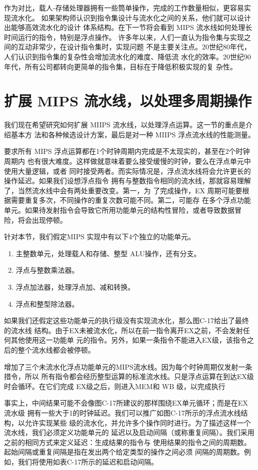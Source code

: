 作为对比，载人-存储处理器拥有一些筒单操作，完成的工作数量相似，更容易实现流水化。
如果架构师认识到指令集设计与流水化之间的关系，他们就可以设计出能够高效流水化的设计
体系结构。在下一节将会看到 MIPS 流水线如何处理长时间运行的指令，特别是浮点操作。
许多年以来，人们一直认为指令集与实现之间的互动非常少，在设计指令集时，实现问题
不是主要关注点。20世纪80年代，人们认识到指令集的复杂性会增加流水化的难度、降低流
水化的效率。20世纪90年代，所有公司都转向更简单的指令集，目标在于降低积极实现的复
杂性。

\section{扩展 MIPS 流水线，以处理多周期操作}

我们现在希望研究如何扩展 MIIPS 流水线，以处理浮点运算。这一节的重点是介绍基本方
法和各种候选设计方案，最后是对一种 MIIPS 浮点流水线的性能测量。

要求所有 MIPS 浮点运算都在1个时钟周期内完成是不太现实的，甚至在2个时钟周期内
也有很大难度。这样做就意味着要么接受缓慢的时钟，要么在浮点单元中使用大量逻辑，或者
同时接受两者。而实际情况是，浮点流水线将会允许更长的操作延迟。如果我们设想浮点指令
拥有与整数指令相同的流水线，那就容易理解了，当然流水线中会有两处重要改变。第一，为
了完成操作，EX 周期可能要根据需要重复多次，不同操作的重复次数可能不同。第二，可能存
在多个浮点功能单元。如果待发射指令会导致它所用功能单元的结构性冒险，或者导致数据冒
险，将会出现停顿。

针对本节，我们假定MIPS 实现中有以下4个独立的功能单元。
\begin{enumerate}
    \item 主整数单元，处理载人和存储、整型 ALU操作，还有分支。
    \item 浮点与整数乘法器。
    \item 浮点加法器，处理浮点加、减和转换。
    \item 浮点和整型除法器。
\end{enumerate}

如果我们还假定这些功能单元的执行级没有实现流水化，那么图C-17给出了最终的流水线
结构。由于EX未被流水化，所以在前一指令离开EX之前，不会发射任何其他使用这一功能单
元的指令。另外，如果一条指令不能进入EX级，该指令之后的整个流水线都会被停顿。

增加了三个未流水化浮点功能单元的MIPS流水线。因为每个时钟周期仅发射一条措令，所以
所有指令都会经历整型运算的标准流水线。只是浮点运算在到达EX级时会循环。在它们完成
EX级之后，则进入MEM和 WB 级，以完成执行

事实上，中间结果可能不会像图C-17所建议的那样围绕EX单元循环；而是在EX 流水级
拥有一些大于1的时钟延迟。我们可以推广如图C-17所示的浮点流水线结构，以允许实现某些
级的流水化，并允许多个操作同时进行。为了描述这样一个流水线，我们必须定义功能单元的
延迟以及启动间隔（或称重复间隔）。我们采用之前的相同方式来定义延迟：生成结果的指令与
使用结果的指令之间的周期数。起始间隔或重复间隔是指在发出两个给定类型的操作之间必须
间隔的周期数。例如，我们将使用如表C-17所示的延迟和启动间隔。

